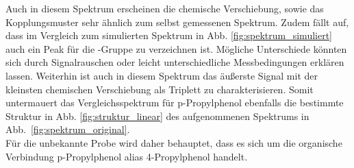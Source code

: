 Auch in diesem Spektrum erscheinen die chemische Verschiebung, sowie das Kopplungsmuster sehr ähnlich zum selbst gemessenen Spektrum. Zudem fällt auf, dass im Vergleich zum simulierten Spektrum in Abb. \ref{fig:spektrum_simuliert} auch ein Peak für die  -Gruppe zu verzeichnen ist. Mögliche Unterschiede könnten sich durch Signalrauschen oder leicht unterschiedliche Messbedingungen erklären lassen. Weiterhin ist auch in diesem Spektrum das äußerste Signal mit der kleinsten chemischen Verschiebung als Triplett zu charakterisieren.
Somit untermauert das Vergleichsspektrum für p-Propylphenol ebenfalls die bestimmte Struktur in Abb. \ref{fig:struktur_linear} des aufgenommenen Spektrums in \mbox{Abb. \ref{fig:spektrum_original}}. \\

Für die unbekannte Probe wird daher behauptet, dass es sich um die organische Verbindung p-Propylphenol alias 4-Propylphenol handelt.